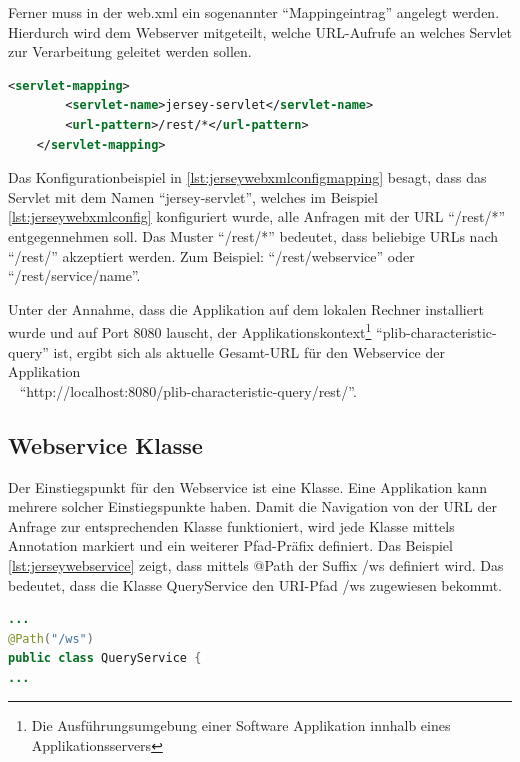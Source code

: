 Ferner muss in der web.xml ein sogenannter \enquote{Mappingeintrag} angelegt werden. Hierdurch wird dem Webserver mitgeteilt, welche \gls{URL}-Aufrufe an welches \gls{Servlet} zur Verarbeitung geleitet werden sollen. 
 
  \begin{lstlisting}[caption=Jersey Servlet Mappingkonfiguration in web.xml, language=XML, label=lst:jerseywebxmlconfigmapping]
    <servlet-mapping>
        <servlet-name>jersey-servlet</servlet-name>
        <url-pattern>/rest/*</url-pattern>
    </servlet-mapping>
 \end{lstlisting}  
 
Das Konfigurationbeispiel in \autoref{lst:jerseywebxmlconfigmapping}  besagt, dass das \gls{Servlet} mit dem Namen \enquote{jersey-servlet}, welches im Beispiel \autoref{lst:jerseywebxmlconfig}  konfiguriert wurde, alle Anfragen mit der URL \enquote{/rest/*} entgegennehmen soll. Das Muster \enquote{/rest/*} bedeutet, dass beliebige URLs nach \enquote{/rest/} akzeptiert werden. Zum Beispiel: \enquote{/rest/webservice} oder \enquote{/rest/service/name}.

Unter der Annahme, dass die Applikation auf dem lokalen Rechner installiert wurde und auf Port 8080 lauscht, der \gls{Applikationskontext}\footnote{Die Ausführungsumgebung einer Software Applikation innhalb eines Applikationsservers} \enquote{plib-characteristic-query} ist, ergibt sich als aktuelle Gesamt-URL für den \gls{Webservice} der Applikation \\~
\enquote{http://localhost:8080/plib-characteristic-query/rest/}.

\subsection{Webservice Klasse}
Der Einstiegspunkt für den \gls{Webservice} ist eine Klasse. Eine Applikation kann mehrere solcher Einstiegspunkte haben. Damit die Navigation von der \gls{URL} der Anfrage zur entsprechenden Klasse funktioniert, wird jede Klasse mittels Annotation markiert und ein weiterer Pfad-Präfix definiert. Das Beispiel 
\autoref{lst:jerseywebservice} zeigt, dass mittels @Path der Suffix /ws definiert wird. Das bedeutet, dass die Klasse QueryService den \gls{URI}-Pfad /ws zugewiesen bekommt. 
  \begin{lstlisting}[caption=Jersey Webservice Klasse, language=Java, label=lst:jerseywebservice]
...
@Path("/ws")
public class QueryService {
...
 \end{lstlisting}  
 
